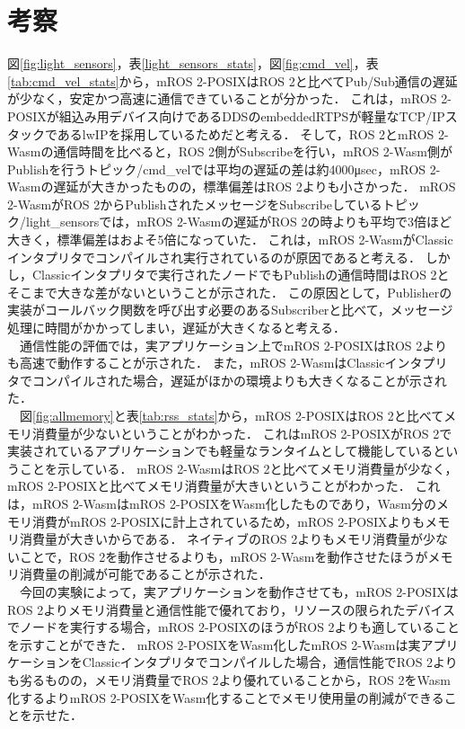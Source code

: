 \section{考察}
図\ref{fig:light_sensors}，表\ref{light_sensors_stats}，図\ref{fig:cmd_vel}，表\ref{tab:cmd_vel_stats}から，mROS 2-POSIXはROS 2と比べてPub/Sub通信の遅延が少なく，安定かつ高速に通信できていることが分かった．
これは，mROS 2-POSIXが組込み用デバイス向けであるDDSのembeddedRTPSが軽量なTCP/IPスタックであるlwIPを採用しているためだと考える．
そして，ROS 2とmROS 2-Wasmの通信時間を比べると，ROS 2側がSubscribeを行い，mROS 2-Wasm側がPublishを行うトピック/cmd\_velでは平均の遅延の差は約4000μsec，mROS 2-Wasmの遅延が大きかったものの，標準偏差はROS 2よりも小さかった．
mROS 2-WasmがROS 2からPublishされたメッセージをSubscribeしているトピック/light\_sensorsでは，mROS 2-Wasmの遅延がROS 2の時よりも平均で3倍ほど大きく，標準偏差はおよそ5倍になっていた．
これは，mROS 2-WasmがClassicインタプリタでコンパイルされ実行されているのが原因であると考える．
しかし，Classicインタプリタで実行されたノードでもPublishの通信時間はROS 2とそこまで大きな差がないということが示された．
この原因として，Publisherの実装がコールバック関数を呼び出す必要のあるSubscriberと比べて，メッセージ処理に時間がかかってしまい，遅延が大きくなると考える．
\\　通信性能の評価では，実アプリケーション上でmROS 2-POSIXはROS 2よりも高速で動作することが示された．
また，mROS 2-WasmはClassicインタプリタでコンパイルされた場合，遅延がほかの環境よりも大きくなることが示された．
\\　図\ref{fig:allmemory}と表\ref{tab:rss_stats}から，mROS 2-POSIXはROS 2と比べてメモリ消費量が少ないということがわかった．
これはmROS 2-POSIXがROS 2で実装されているアプリケーションでも軽量なランタイムとして機能しているということを示している．
mROS 2-WasmはROS 2と比べてメモリ消費量が少なく，mROS 2-POSIXと比べてメモリ消費量が大きいということがわかった．
これは，mROS 2-WasmはmROS 2-POSIXをWasm化したものであり，Wasm分のメモリ消費がmROS 2-POSIXに計上されているため，mROS 2-POSIXよりもメモリ消費量が大きいからである．
ネイティブのROS 2よりもメモリ消費量が少ないことで，ROS 2を動作させるよりも，mROS 2-Wasmを動作させたほうがメモリ消費量の削減が可能であることが示された．
\\　今回の実験によって，実アプリケーションを動作させても，mROS 2-POSIXはROS 2よりメモリ消費量と通信性能で優れており，リソースの限られたデバイスでノードを実行する場合，mROS 2-POSIXのほうがROS 2よりも適していることを示すことができた．
mROS 2-POSIXをWasm化したmROS 2-Wasmは実アプリケーションをClassicインタプリタでコンパイルした場合，通信性能でROS 2よりも劣るものの，メモリ消費量でROS 2より優れていることから，ROS 2をWasm化するよりmROS 2-POSIXをWasm化することでメモリ使用量の削減ができることを示せた．
